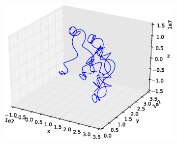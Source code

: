 \documentclass[x11names]{article}
\renewcommand{\va}{\vec}
\begin{document}
    \begin{figure}
      \begin{subfigure}{0.45\textwidth}
        \includegraphics[width = \textwidth]{../source/3DPlotEuler}
      \end{subfigure}
    \end{figure}
\end{document}
